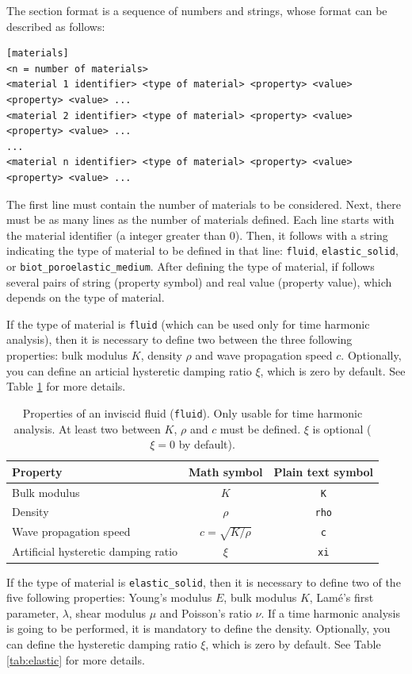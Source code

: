 \documentclass[a4paper,fleqn]{book}
\begin{document}
The section format is a sequence of numbers and strings, whose format can be described as follows:
\begin{Verbatim}[frame=single, fontsize=\small, label={general format of section [materials]}]
[materials]
<n = number of materials>
<material 1 identifier> <type of material> <property> <value> <property> <value> ...
<material 2 identifier> <type of material> <property> <value> <property> <value> ...
...
<material n identifier> <type of material> <property> <value> <property> <value> ...
\end{Verbatim}
The first line must contain the number of materials to be considered. Next, there must be as many lines as the number of materials defined. Each line starts with the material identifier (a integer greater than 0). Then, it follows with a string indicating the type of material to be defined in that line: \texttt{fluid}, \texttt{elastic\_solid}, or \texttt{biot\_poroelastic\_medium}. After defining the type of material, if follows several pairs of string (property symbol) and real value (property value), which depends on the type of material. 

If the type of material is \texttt{fluid} (which can be used only for time harmonic analysis), then it is necessary to define two between the three following properties: bulk modulus $K$, density $\rho$ and wave propagation speed $c$. Optionally, you can define an articial hysteretic damping ratio $\xi$, which is zero by default. See Table \ref{tab:fluid} for more details.

\begin{table}[h]
\centering
{\small
\begin{tabular}{lcc}
\textbf{Property} & \textbf{Math symbol} & \textbf{Plain text symbol} \\
\midrule
Bulk modulus             & $K$                & \texttt{K}   \\
Density                  & $\rho$             & \texttt{rho} \\
Wave propagation speed   & $c=\sqrt{K/\rho}$  & \texttt{c}   \\ 
Artificial hysteretic damping ratio  & $\xi$  & \texttt{xi} 
\end{tabular}
}
\caption{Properties of an inviscid fluid (\texttt{fluid}). Only usable for time harmonic analysis. At least two between $K$, $\rho$ and $c$ must be defined. $\xi$ is optional ($\xi=0$ by default).}
\label{tab:fluid}
\end{table}

If the type of material is \texttt{elastic\_solid}, then it is necessary to define two of the five following properties: Young's modulus $E$, bulk modulus $K$, Lam\'e's first parameter, $\lambda$, shear modulus $\mu$ and Poisson's ratio $\nu$. If a time harmonic analysis is going to be performed, it is mandatory to define the density. Optionally, you can define the hysteretic damping ratio $\xi$, which is zero by default. See Table \ref{tab:elastic} for more details.
\end{document}
